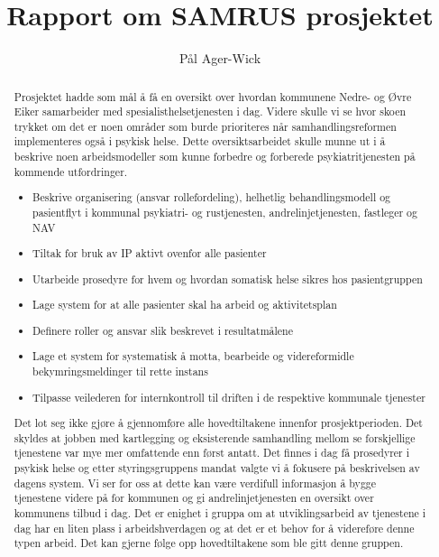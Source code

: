 \documentclass[11pt]{report} %
\title{Rapport om SAMRUS prosjektet}
\author{Pål Ager-Wick}
\begin{document}
\pagecolor{f_page}\afterpage{\nopagecolor}
\maketitle



\renewcommand{\abstractname}{Oppsummering}

\begin{abstract}Prosjektet hadde som mål å få en oversikt over hvordan kommunene Nedre- og Øvre Eiker samarbeider med spesialisthelsetjenesten i dag. Videre skulle vi se hvor skoen trykket om det er noen områder som burde prioriteres når samhandlingsreformen implementeres også i psykisk helse. Dette oversiktsarbeidet skulle munne ut i å beskrive noen arbeidsmodeller som kunne forbedre og forberede psykiatritjenesten på kommende utfordringer. 

\begin{itemize}
  \item Beskrive organisering (ansvar rollefordeling), helhetlig behandlingsmodell og pasientflyt i kommunal psykiatri- og rustjenesten, andrelinjetjenesten, fastleger og NAV
  \item Tiltak for bruk av IP aktivt ovenfor alle pasienter
  \item Utarbeide prosedyre for hvem og hvordan somatisk helse sikres hos pasientgruppen
  \item Lage system for at alle pasienter skal ha arbeid og aktivitetsplan
  \item Definere roller og ansvar slik beskrevet i resultatmålene
  \item Lage et system for systematisk å motta, bearbeide og videreformidle bekymringsmeldinger til rette instans
  \item Tilpasse veilederen for internkontroll til driften i de respektive kommunale tjenester
\end{itemize}
Det lot seg ikke gjøre å gjennomføre alle hovedtiltakene innenfor prosjektperioden. Det skyldes at jobben med kartlegging og eksisterende samhandling mellom se forskjellige tjenestene var mye mer omfattende enn først antatt. Det finnes i dag få prosedyrer i psykisk helse og etter styringsgruppens mandat valgte vi å fokusere på beskrivelsen av dagens system. Vi ser for oss at dette kan være verdifull informasjon å bygge tjenestene videre på for kommunen og gi andrelinjetjenesten en oversikt over kommunens tilbud i dag. Det er enighet i gruppa om at utviklingsarbeid av tjenestene i dag har en liten plass i arbeidshverdagen og at det er et behov for å videreføre denne typen arbeid. Det kan gjerne følge opp hovedtiltakene som ble gitt denne gruppen.

\end{abstract}
\end{document}
